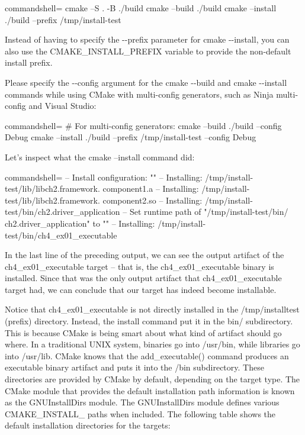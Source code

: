 \begin{tcblisting}{commandshell={}}
cmake –S . -B ./build
cmake --build ./build
cmake --install ./build --prefix /tmp/install-test
\end{tcblisting}

\begin{tcolorbox}[colback=webgreen!5!white,colframe=webgreen!75!black,title=Note]
Instead of having to specify the -{}-prefix parameter for cmake -{}-install, you can also use the CMAKE\_INSTALL\_PREFIX variable to provide the non-default install prefix.

Please specify the -{}-config argument for the cmake -{}-build and cmake -{}-install commands while using CMake with multi-config generators, such as Ninja multi-config and Visual Studio:

\begin{tcblisting}{commandshell={}}
# For multi-config generators:
cmake --build ./build --config Debug
cmake --install ./build --prefix /tmp/install-test
--config Debug
\end{tcblisting}
\end{tcolorbox}

Let's inspect what the cmake --install command did:

\begin{tcblisting}{commandshell={}}
-- Install configuration: ""
-- Installing: /tmp/install-test/lib/libch2.framework.
    component1.a
-- Installing: /tmp/install-test/lib/libch2.framework.
    component2.so
-- Installing: /tmp/install-test/bin/ch2.driver_application
-- Set runtime path of "/tmp/install-test/bin/
    ch2.driver_application" to ""
-- Installing: /tmp/install-test/bin/ch4_ex01_executable
\end{tcblisting}

In the last line of the preceding output, we can see the output artifact of the ch4\_ex01\_executable target – that is, the ch4\_ex01\_executable binary is installed. Since that was the only output artifact that ch4\_ex01\_executable target had, we can conclude that our target has indeed become installable.

Notice that ch4\_ex01\_executable is not directly installed in the /tmp/installtest (prefix) directory. Instead, the install command put it in the bin/ subdirectory. This is because CMake is being smart about what kind of artifact should go where. In a traditional UNIX system, binaries go into /usr/bin, while libraries go into /usr/lib. CMake knows that the add\_executable() command produces an executable binary artifact and puts it into the /bin subdirectory. These directories are provided by CMake by default, depending on the target type. The CMake module that provides the default installation path information is known as the GNUInstallDirs module. The GNUInstallDirs module defines various CMAKE\_INSTALL\_ paths when included. The following table shows the default installation directories for the targets:

